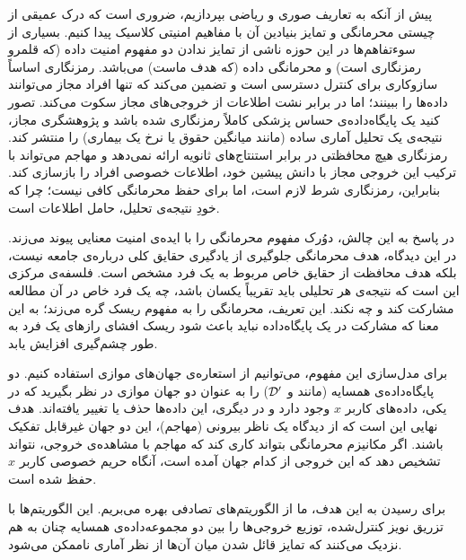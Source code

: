 پیش از آنکه به تعاریف صوری و ریاضی بپردازیم، ضروری است که درک عمیقی از چیستی محرمانگی و تمایز بنیادین آن با مفاهیم امنیتی کلاسیک پیدا کنیم. بسیاری از سوءتفاهم‌ها در این حوزه ناشی از تمایز ندادن دو مفهوم امنیت داده (که قلمرو رمزنگاری است) و محرمانگی داده (که هدف ماست) می‌باشد. رمزنگاری اساساً سازوکاری برای کنترل دسترسی است و تضمین می‌کند که تنها افراد مجاز می‌توانند داده‌ها را ببینند؛ اما در برابر نشت اطلاعات از خروجی‌های مجاز سکوت می‌کند. تصور کنید یک پایگاه‌داده‌ی حساس پزشکی کاملاً رمزنگاری شده باشد و پژوهشگری مجاز، نتیجه‌ی یک تحلیل آماری ساده (مانند میانگین حقوق یا نرخ یک بیماری) را منتشر کند. رمزنگاری هیچ محافظتی در برابر استنتاج‌های ثانویه ارائه نمی‌دهد و مهاجم می‌تواند با ترکیب این خروجی مجاز با دانش پیشین خود، اطلاعات خصوصی افراد را بازسازی کند. بنابراین، رمزنگاری شرط لازم است، اما برای حفظ محرمانگی کافی نیست؛ چرا که خودِ نتیجه‌ی تحلیل، حامل اطلاعات است.

در پاسخ به این چالش، دوُرک مفهوم محرمانگی را با ایده‌ی امنیت معنایی پیوند می‌زند. در این دیدگاه، هدف محرمانگی جلوگیری از یادگیری حقایق کلی درباره‌ی جامعه نیست، بلکه هدف محافظت از حقایق خاص مربوط به یک فرد مشخص است. فلسفه‌ی مرکزی این است که نتیجه‌ی هر تحلیلی باید تقریباً یکسان باشد، چه یک فرد خاص در آن مطالعه مشارکت کند و چه نکند. این تعریف، محرمانگی را به مفهوم ریسک گره می‌زند؛ به این معنا که مشارکت در یک پایگاه‌داده نباید باعث شود ریسک افشای رازهای یک فرد به طور چشم‌گیری افزایش یابد.

برای مدل‌سازی این مفهوم، می‌توانیم از استعاره‌ی جهان‌های موازی استفاده کنیم. دو پایگاه‌داده‌ی همسایه (مانند \Dset و $\Dset'$) را به عنوان دو جهان موازی در نظر بگیرید که در یکی، داده‌های کاربر $x$ وجود دارد و در دیگری، این داده‌ها حذف یا تغییر یافته‌اند. هدف نهایی این است که از دیدگاه یک ناظر بیرونی (مهاجم)، این دو جهان غیرقابل تفکیک باشند. اگر مکانیزم محرمانگی بتواند کاری کند که مهاجم با مشاهده‌ی خروجی، نتواند تشخیص دهد که این خروجی از کدام جهان آمده است، آنگاه حریم خصوصی کاربر $x$ حفظ شده است. 

برای رسیدن به این هدف، ما از الگوریتم‌های تصادفی بهره می‌بریم. این الگوریتم‌ها با تزریق نویز کنترل‌شده، توزیع خروجی‌ها را بین دو مجموعه‌داده‌ی همسایه چنان به هم نزدیک می‌کنند که تمایز قائل شدن میان آن‌ها از نظر آماری ناممکن می‌شود.


